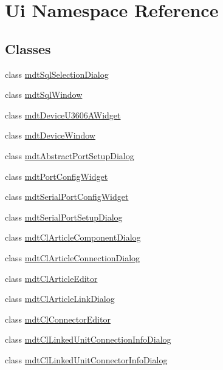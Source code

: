 \hypertarget{namespace_ui}{\section{Ui Namespace Reference}
\label{namespace_ui}
}
\subsection*{Classes}
\begin{DoxyCompactItemize}
\item 
class \hyperlink{class_ui_1_1mdt_sql_selection_dialog}{mdt\-Sql\-Selection\-Dialog}
\item 
class \hyperlink{class_ui_1_1mdt_sql_window}{mdt\-Sql\-Window}
\item 
class \hyperlink{class_ui_1_1mdt_device_u3606_a_widget}{mdt\-Device\-U3606\-A\-Widget}
\item 
class \hyperlink{class_ui_1_1mdt_device_window}{mdt\-Device\-Window}
\item 
class \hyperlink{class_ui_1_1mdt_abstract_port_setup_dialog}{mdt\-Abstract\-Port\-Setup\-Dialog}
\item 
class \hyperlink{class_ui_1_1mdt_port_config_widget}{mdt\-Port\-Config\-Widget}
\item 
class \hyperlink{class_ui_1_1mdt_serial_port_config_widget}{mdt\-Serial\-Port\-Config\-Widget}
\item 
class \hyperlink{class_ui_1_1mdt_serial_port_setup_dialog}{mdt\-Serial\-Port\-Setup\-Dialog}
\item 
class \hyperlink{class_ui_1_1mdt_cl_article_component_dialog}{mdt\-Cl\-Article\-Component\-Dialog}
\item 
class \hyperlink{class_ui_1_1mdt_cl_article_connection_dialog}{mdt\-Cl\-Article\-Connection\-Dialog}
\item 
class \hyperlink{class_ui_1_1mdt_cl_article_editor}{mdt\-Cl\-Article\-Editor}
\item 
class \hyperlink{class_ui_1_1mdt_cl_article_link_dialog}{mdt\-Cl\-Article\-Link\-Dialog}
\item 
class \hyperlink{class_ui_1_1mdt_cl_connector_editor}{mdt\-Cl\-Connector\-Editor}
\item 
class \hyperlink{class_ui_1_1mdt_cl_linked_unit_connection_info_dialog}{mdt\-Cl\-Linked\-Unit\-Connection\-Info\-Dialog}
\item 
class \hyperlink{class_ui_1_1mdt_cl_linked_unit_connector_info_dialog}{mdt\-Cl\-Linked\-Unit\-Connector\-Info\-Dialog}
\item 

\end{DoxyCompactItemize}
